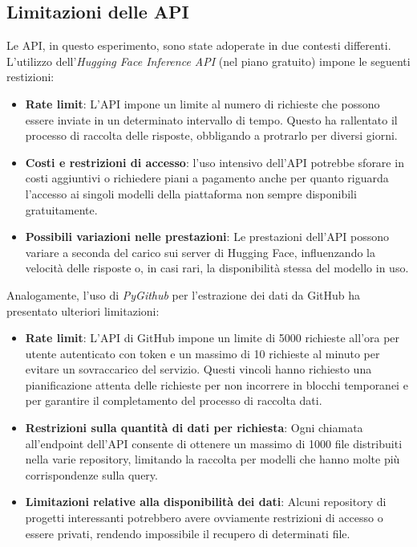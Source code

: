 \documentclass{article}
\begin{document}
\subsection{Limitazioni delle API}
Le API, in questo esperimento, sono state adoperate in due contesti differenti.\\
L'utilizzo dell’\textit{Hugging Face Inference API} (nel piano gratuito) impone le seguenti restizioni:
\begin{itemize}
    \item \textbf{Rate limit}: L’API impone un limite al numero di richieste che possono essere inviate in un determinato intervallo di tempo. Questo ha rallentato il processo di raccolta delle risposte, obbligando a protrarlo per diversi giorni. 
    \item \textbf{Costi e restrizioni di accesso}: l'uso intensivo dell'API potrebbe sforare in costi aggiuntivi o richiedere piani a pagamento anche per quanto riguarda l'accesso ai singoli modelli della piattaforma non sempre disponibili gratuitamente.
    \item \textbf{Possibili variazioni nelle prestazioni}: Le prestazioni dell’API possono variare a seconda del carico sui server di Hugging Face, influenzando la velocità delle risposte o, in casi rari, la disponibilità stessa del modello in uso.
\end{itemize}
Analogamente, l'uso di \textit{PyGithub} per l'estrazione dei dati da GitHub ha presentato ulteriori limitazioni:
\begin{itemize}
\item \textbf{Rate limit}: L'API di GitHub impone un limite di 5000 richieste all'ora per utente autenticato con token e un massimo di 10 richieste al minuto per evitare un sovraccarico del servizio. Questi vincoli hanno richiesto una pianificazione attenta delle richieste per non incorrere in blocchi temporanei e per garantire il completamento del processo di raccolta dati.
\item \textbf{Restrizioni sulla quantità di dati per richiesta}: Ogni chiamata all'endpoint dell'API consente di ottenere un massimo di 1000 file distribuiti nella varie repository, limitando la raccolta per modelli che hanno molte più corrispondenze sulla query.
\item \textbf{Limitazioni relative alla disponibilità dei dati}: Alcuni repository di progetti interessanti potrebbero avere ovviamente restrizioni di accesso o essere privati, rendendo impossibile il recupero di determinati file.
\end{itemize}
\end{document}
